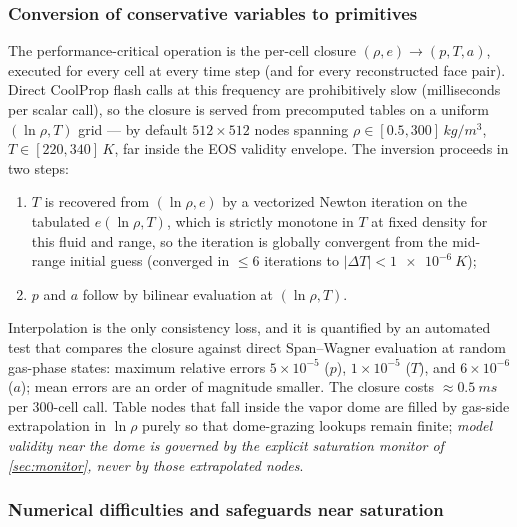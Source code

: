 \documentclass[11pt]{article}
\begin{document}
\subsubsection{Conversion of conservative variables to primitives}
\label{sec:tables}

The performance-critical operation is the per-cell closure
$(\rho, e) \to (p, T, a)$, executed for every cell at every time step
(and for every reconstructed face pair). Direct CoolProp flash calls at
this frequency are prohibitively slow (milliseconds per scalar call),
so the closure is served from precomputed tables on a uniform
$(\ln\rho, T)$ grid --- by default $512\times512$ nodes spanning
$\rho \in [0.5, 300]\,\si{kg/m^3}$, $T \in [220, 340]\,\si{K}$, far
inside the EOS validity envelope. The inversion proceeds in two steps:
\begin{enumerate}
\item $T$ is recovered from $(\ln\rho, e)$ by a vectorized Newton
iteration on the tabulated $e(\ln\rho, T)$, which is strictly monotone
in $T$ at fixed density for this fluid and range, so the iteration is
globally convergent from the mid-range initial guess (converged in
$\le 6$ iterations to $|\Delta T| < \SI{1e-6}{K}$);
\item $p$ and $a$ follow by bilinear evaluation at $(\ln\rho, T)$.
\end{enumerate}
Interpolation is the only consistency loss, and it is quantified by an
automated test that compares the closure against direct Span--Wagner
evaluation at random gas-phase states: maximum relative errors
$5\times10^{-5}$ ($p$), $1\times10^{-5}$ ($T$), and $6\times10^{-6}$
($a$); mean errors are an order of magnitude smaller. The closure costs
$\approx\SI{0.5}{ms}$ per 300-cell call. Table nodes that fall inside
the vapor dome are filled by gas-side extrapolation in $\ln\rho$ purely
so that dome-grazing lookups remain finite; \emph{model validity near
the dome is governed by the explicit saturation monitor of
\cref{sec:monitor}, never by those extrapolated nodes}.

\subsubsection{Numerical difficulties and safeguards near saturation}
\label{sec:safeguards}
\end{document}
